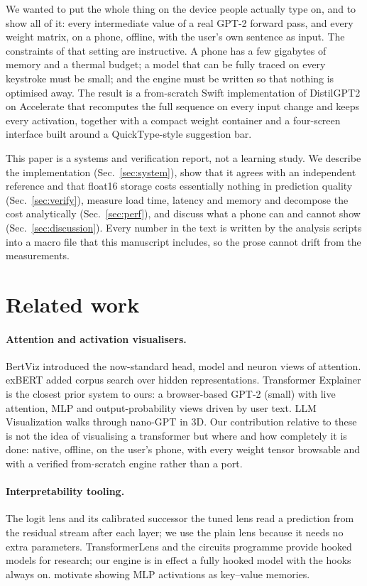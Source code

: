 \documentclass[11pt]{article}
\begin{document}
We wanted to put the whole thing on the device people actually type on, and to show all of it: every intermediate value of a real GPT-2 forward pass, and every weight matrix, on a phone, offline, with the user's own sentence as input. The constraints of that setting are instructive. A phone has a few gigabytes of memory and a thermal budget; a model that can be fully traced on every keystroke must be small; and the engine must be written so that nothing is optimised away. The result is a from-scratch Swift implementation of DistilGPT2 \citep{sanh2019,radford2019} on Accelerate that recomputes the full sequence on every input change and keeps every activation, together with a compact weight container and a four-screen interface built around a QuickType-style suggestion bar.

This paper is a systems and verification report, not a learning study. We describe the implementation (Sec.~\ref{sec:system}), show that it agrees with an independent reference and that float16 storage costs essentially nothing in prediction quality (Sec.~\ref{sec:verify}), measure load time, latency and memory and decompose the cost analytically (Sec.~\ref{sec:perf}), and discuss what a phone can and cannot show (Sec.~\ref{sec:discussion}). Every number in the text is written by the analysis scripts into a macro file that this manuscript includes, so the prose cannot drift from the measurements.

\section{Related work}
\paragraph{Attention and activation visualisers.} BertViz \citep{vig2019} introduced the now-standard head, model and neuron views of attention. exBERT \citep{hoover2020} added corpus search over hidden representations. Transformer Explainer \citep{cho2024} is the closest prior system to ours: a browser-based GPT-2 (small) with live attention, MLP and output-probability views driven by user text. LLM Visualization \citep{bycroft2023} walks through nano-GPT in 3D. Our contribution relative to these is not the idea of visualising a transformer but where and how completely it is done: native, offline, on the user's phone, with every weight tensor browsable and with a verified from-scratch engine rather than a port.

\paragraph{Interpretability tooling.} The logit lens \citep{nostalgebraist2020} and its calibrated successor the tuned lens \citep{belrose2023} read a prediction from the residual stream after each layer; we use the plain lens because it needs no extra parameters. TransformerLens \citep{nanda2022} and the circuits programme \citep{elhage2021} provide hooked models for research; our engine is in effect a fully hooked model with the hooks always on. \citet{geva2021} motivate showing MLP activations as key--value memories.
\end{document}
